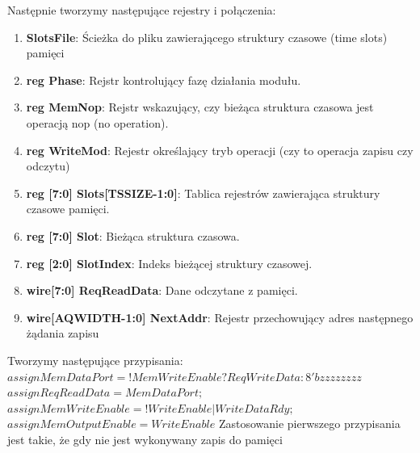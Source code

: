 \documentclass[12pt, a4paper]{article}
\begin{document}
\newline{}
Następnie tworzymy następujące rejestry i połączenia:
\begin{enumerate}
    \item \textbf{\fontsize{11}{10}\selectfont SlotsFile}: Ścieżka do pliku zawierającego struktury czasowe (time slots) pamięci
    \item \textbf{\fontsize{11}{10}\selectfont reg Phase}: Rejstr kontrolujący fazę działania modułu.
    \item \textbf{\fontsize{11}{10}\selectfont reg MemNop}: Rejstr wskazujący, czy bieżąca struktura czasowa jest operacją nop (no operation).
    \item \textbf{\fontsize{11}{10}\selectfont reg WriteMod}:  Rejestr określający tryb operacji (czy to operacja zapisu czy odczytu)
    \item \textbf{\fontsize{11}{10}\selectfont reg [7:0] Slots[TSSIZE-1:0]}: Tablica rejestrów  zawierająca struktury czasowe pamięci.
    \item \textbf{\fontsize{11}{10}\selectfont reg [7:0] Slot}: Bieżąca struktura czasowa.
    \item \textbf{\fontsize{11}{10}\selectfont reg [2:0] SlotIndex}: Indeks bieżącej struktury czasowej.
    \item \textbf{\fontsize{11}{10}\selectfont wire[7:0] ReqReadData}: Dane odczytane z pamięci.
     \item \textbf{\fontsize{11}{10}\selectfont wire[AQWIDTH-1:0] NextAddr}: Rejestr przechowujący adres następnego żądania zapisu
    
\end{enumerate}
Tworzymy następujące przypisania: 
\newline{}
\newline{}
\indent \( \mathit{assign MemDataPort = !MemWriteEnable ? ReqWriteData : 8'bzzzzzzzz}\)
\newline{}
\newline{}
\indent \( \mathit{assign ReqReadData = MemDataPort;}\)
\newline{}
\newline{}
\indent \( \mathit{assign MemWriteEnable = !WriteEnable | WriteDataRdy;}\)
\newline{}
\newline{}
\indent \( \mathit{assign MemOutputEnable = WriteEnable}\)
\newline{}
\newline{}
Zastosowanie pierwszego przypisania jest takie, że gdy nie jest wykonywany zapis do pamięci 
\end{document}
